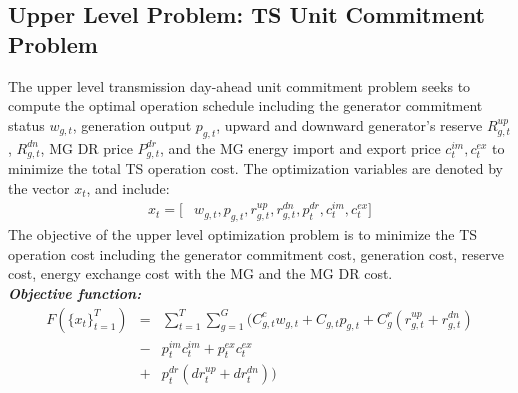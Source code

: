 \subsection{Upper Level Problem: TS Unit Commitment Problem}

The upper level transmission day-ahead unit commitment problem seeks to compute the optimal operation schedule including the generator commitment status $w_{g,t}$, generation output $p_{g,t}$, upward and downward generator's reserve $R^{up}_{g,t}$, $R^{dn}_{g,t}$, MG DR price $P^{dr}_{g,t}$, and the MG energy import and export price $c^{im}_{t}, c^{ex}_{t}$ to minimize the total TS operation cost. The optimization variables are denoted by the vector $x_t$, and include:
\begin{align*}
x_t=[&w_{g,t}, p_{g,t}, r_{g,t}^{up}, r_{g,t}^{dn}, p^{dr}_{t}, c^{im}_{t} , c^{ex}_{t}]
\end{align*}
The objective of the upper level optimization problem is to minimize the TS operation cost including the generator commitment cost, generation cost, reserve cost, energy exchange cost with the MG and the MG DR cost. \\
\textbf{\emph{Objective function:} }
\begin{equation*}
\begin{array}{lcl}
F(\{x_t\}^{T}_{t=1}) &=& \sum_{t=1}^{T}\sum_{g=1}^{G}(C^c_{g,t} w_{g,t}+C_{g,t} p_{g,t}+C^r_{g}(r_{g,t}^{up}+r_{g,t}^{dn})\\
&-&p^{im}_{t}c^{im}_{t}+p^{ex}_{t}c^{ex}_{t}\\
&+&p^{dr}_{t}(dr_{t}^{up}+dr_{t}^{dn}))
\end{array}
\label{eqn:obj}
\end{equation*}

